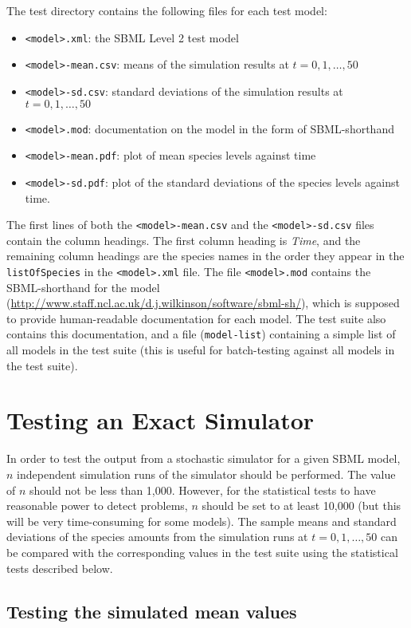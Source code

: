 \documentclass[12pt,a4paper]{article}
\begin{document}
The test directory contains the following files for each test model: 
\begin{itemize}
\item \verb$<model>.xml$: the SBML Level 2 test model
\item \verb$<model>-mean.csv$: means of the simulation results at $t = 0,1,\ldots,50$
\item \verb$<model>-sd.csv$: standard deviations of the simulation results at $t = 0,1,\ldots,50$
\item \verb$<model>.mod$: documentation on the model in the form of SBML-shorthand
\item \verb$<model>-mean.pdf$: plot of mean species levels against time 
\item \verb$<model>-sd.pdf$: plot of the standard deviations of the species levels against time. 
\end{itemize}
The first lines of both the \verb$<model>-mean.csv$ and the
\verb$<model>-sd.csv$ files contain the column headings. The first
column heading is \emph{Time}, and the remaining column headings are
the species names in the order they appear in the \verb$listOfSpecies$
in the \verb$<model>.xml$ file. The file \verb$<model>.mod$ contains
the SBML-shorthand for the model
(\url{http://www.staff.ncl.ac.uk/d.j.wilkinson/software/sbml-sh/}),
which is supposed to provide human-readable documentation for each
model. The test suite also contains this documentation, and a file
(\verb$model-list$) containing a simple list of all models in the test
suite (this is useful for batch-testing against all models in the test
suite).

\section{Testing an Exact Simulator}

In order to test the output from a stochastic simulator for a given
SBML model, $n$ independent simulation runs of the simulator should be
performed. The value of $n$ should not be less than 1,000. However,
for the statistical tests to have reasonable power to detect problems,
$n$ should be set to at least 10,000 (but this will be very
time-consuming for some models). The sample means and standard
deviations of the species amounts from the simulation runs at
$t=0,1,\ldots,50$ can be compared with the corresponding values in the
test suite using the statistical tests described below.

\subsection{Testing the simulated mean values}
\end{document}
